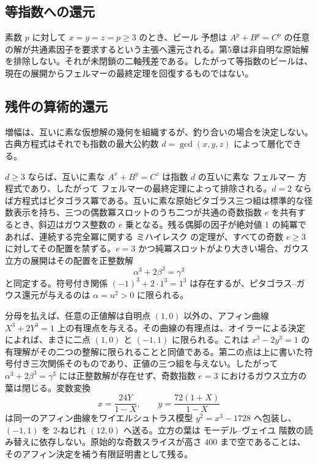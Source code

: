 \documentclass[a4paper]{article}
\theoremstyle{definition}
\theoremstyle{remark}
\begin{document}
\subsection{等指数への還元}

素数 \( p \) に対して \( x = y = z = p \geq 3 \) のとき、ビール 予想は \( A^p + B^p = C^p \) の任意の解が共通素因子を要求するという主張へ還元される。第5章は非自明な原始解を排除しない。それが未閉鎖の二軸残差である。したがって等指数のビールは、現在の展開からフェルマーの最終定理を回復するものではない。

\subsection{残件の算術的還元}

増幅は、互いに素な仮想解の幾何を組織するが、釣り合いの場合を決定しない。古典方程式はそれでも指数の最大公約数 \( d=\gcd(x,y,z) \) によって層化できる。

\( d\ge 3 \) ならば、互いに素な \( A^x+B^y=C^z \) は指数 \( d \) の互いに素な フェルマー 方程式であり、したがって フェルマーの最終定理によって排除される。\( d=2 \) ならば方程式はピタゴラス冪である。互いに素な原始ピタゴラス三つ組は標準的な径数表示を持ち、三つの偶数冪スロットのうち二つが共通の奇数指数 \( e \) を共有するとき、斜辺はガウス整数の \( e \) 乗となる。残る偶脚の因子が絶対値 1 の純冪であれば、連続する完全冪に関する ミハイレスク の定理が、すべての奇数 \( e\ge 3 \) に対してその配置を禁ずる。\( e=3 \) かつ純冪スロットがより大きい場合、ガウス立方の展開はその配置を正整数解
\[
\alpha^3 + 2\beta^3 = \gamma^3
\]
と同定する。符号付き関係 \( (-1)^3 + 2\cdot 1^3 = 1^3 \) は存在するが、ピタゴラス--ガウス還元が与えるのは \( \alpha = u^2 > 0 \) に限られる。

分母を払えば、任意の正値解は自明点 \( (1,0) \) 以外の、アフィン曲線 \( X^3+2Y^3=1 \) 上の有理点を与える。その曲線の有理点は、オイラーによる決定によれば、まさに二点 \( (1,0) \) と \( (-1,1) \) に限られる。これは \( x^3-2y^3=1 \) の有理解がその二つの整解に限られることと同値である。第二の点は上に書いた符号付き三次関係そのものであり、正値の三つ組を与えない。したがって \( \alpha^3+2\beta^3=\gamma^3 \) には正整数解が存在せず、奇数指数 \( e=3 \) におけるガウス立方の葉は閉じる。変数変換
\[
x=\frac{24Y}{1-X},\qquad y=\frac{72(1+X)}{1-X}
\]
は同一のアフィン曲線をワイエルシュトラス模型 \( y^2=x^3-1728 \) へ包装し、\( (-1,1) \) を 2-ねじれ \( (12,0) \) へ送る。立方の葉は モーデル–ヴェイユ 階数の読み替えに依存しない。原始的な奇数スライスが高さ \(400\) まで空であることは、そのアフィン決定を補う有限証明書として残る。
\end{document}
